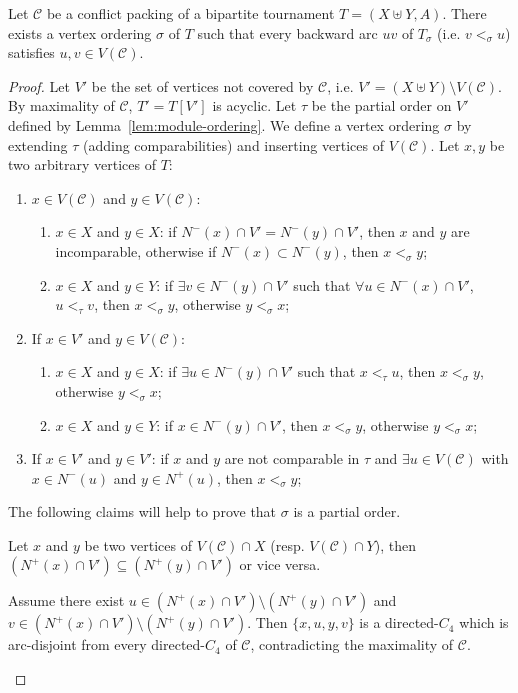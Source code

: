 \begin{lemma} \label{lem:cpfasbt}
Let $\mathcal{C}$ be a conflict packing of a bipartite tournament $T = (X\uplus Y,A)$. There exists a vertex ordering $\sigma$ of $T$ such that every backward arc $uv$ of $T_\sigma$ (i.e. $v<_{\sigma} u$) satisfies $u,v \in V(\mathcal{C})$. 
\end{lemma}
\begin{proof}
Let $V'$ be the set of vertices not covered by $\mathcal{C}$, i.e. $V'=(X\uplus Y)\setminus V(\mathcal{C})$. By maximality of $\mathcal{C}$, $T'=T[V']$ is acyclic. Let $\tau$ be the partial order on $V'$ defined by Lemma~\ref{lem:module-ordering}. We define a vertex ordering $\sigma$ by extending $\tau$ (adding comparabilities) and inserting vertices of $V(\mathcal{C})$.
Let $x,y$ be two arbitrary vertices of $T$:

\begin{enumerate}
\item $x\in V(\mathcal{C})$ and $y\in V(\mathcal{C})$:
\begin{enumerate}
\item $x\in X$ and $y\in X$: if $N^-(x)\cap V'=N^-(y)\cap V'$, then $x$ and $y$ are incomparable, otherwise if $N^-(x)\subset N^-(y)$, then $x<_{\sigma} y$; 
\item  $x\in X$ and $y\in Y$: if  $\exists v\in N^-(y)\cap V'$ such that $\forall u\in N^-(x)\cap V'$, $u<_{\tau} v$, then $x<_{\sigma} y$, otherwise $y<_{\sigma} x$;
\end{enumerate}

\item If $x\in V'$ and $y\in V(\mathcal{C})$: 
\begin{enumerate}
\item $x\in X$ and $y\in X$: 
if $\exists u\in N^-(y)\cap V'$ such that $x<_{\tau} u$, then $x<_{\sigma} y$, otherwise $y<_{\sigma} x$;
\item  $x\in X$ and $y\in Y$: if $x\in N^-(y)\cap V'$, then $x<_{\sigma} y$, otherwise $y<_{\sigma} x$;
\end{enumerate}

\item If $x\in V'$ and $y\in V'$: if $x$ and $y$ are not comparable in $\tau$ and $\exists u\in V(\mathcal{C})$ with $x\in N^-(u)$ and $y\in N^+(u)$, then $x<_{\sigma} y$;
\end{enumerate}

The following claims will help to prove that $\sigma$ is a partial order.
 
\begin{claim} \label{cl:comp}
Let $x$ and $y$ be two vertices of $V(\mathcal{C})\cap X$ (resp. $V(\mathcal{C})\cap Y$), then $(N^+(x)\cap V')\subseteq (N^+(y)\cap V')$ or vice versa.
\end{claim}
\begin{proofclaim}
Assume there exist $u\in (N^+(x)\cap V')\setminus (N^+(y)\cap V')$ and $v\in (N^+(x)\cap V')\setminus (N^+(y)\cap V')$. Then $\{x, u, y, v\}$ is a directed-$C_4$ which is arc-disjoint from every directed-$C_4$ of $\mathcal{C}$, contradicting the maximality of $\mathcal{C}$.
\end{proofclaim}


\end{proof}
